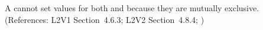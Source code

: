A \Species cannot set values for both  and
 because they are mutually exclusive.  (References:
L2V1 Section~4.6.3; L2V2 Section~4.8.4; )
